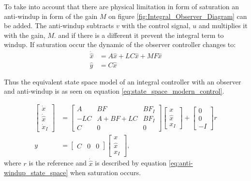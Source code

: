 \documentclass[../../main.tex]{subfiles}
\begin{document}
To take into account that there are physical limitation in form of saturation an anti-windup in form of the gain $M$ on figure \ref{fig:Integral_Observer_Diagram} can be added. The anti-windup subtracts $v$ with the control signal, $u$ and multiplies it with the gain, $M$. and if there is a different it prevent the integral term to windup. 
If saturation occur the dynamic of the observer controller changes to:
\begin{equation}\label{eq:anti-windup_state_space}
    \begin{split}
        \Dot{\hat{x}}&=A\hat{x}+LC\hat{x}+MF\hat{x}\\
        \hat{y}&=C\hat{x}
    \end{split}
\end{equation}

Thus the equivalent state space model of an integral controller with an observer and anti-windup is as seen on equation \ref{eq:state_space_modern_control}.

\begin{equation}\label{eq:state_space_modern_control}
\begin{split}
\begin{bmatrix}
        \dot{x} \\
        \dot{\hat{x}}\\
        \dot{x}_I
    \end{bmatrix} &=
    \begin{bmatrix}
        A & BF & BF_I \\
        -LC & A+BF+LC & BF_I \\
        C & 0 & 0
    \end{bmatrix}
    \begin{bmatrix}
        x \\
        \hat{x} \\
        x_I
    \end{bmatrix}
    + 
    \begin{bmatrix}
    0\\
    0\\
    -I
    \end{bmatrix}
    r \\
    y &= \begin{bmatrix}
        C & 0 & 0
    \end{bmatrix}     
    \begin{bmatrix}
        x \\
        \hat{x} \\
        x_I
    \end{bmatrix}, 
    \end{split}
\end{equation}
where $r$ is the reference and $\Dot{\hat{x}}$ is described by equation \ref{eq:anti-windup_state_space} when saturation occurs.
\end{document}
